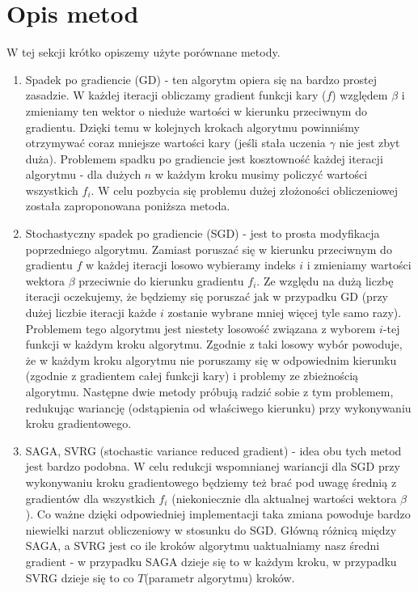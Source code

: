 \documentclass[a4paper]{article}
\begin{document}
\section{Opis metod}
W tej sekcji krótko opiszemy użyte porównane metody.
\begin{enumerate}
\item Spadek po gradiencie (GD) -  ten algorytm opiera się na bardzo prostej zasadzie. W każdej iteracji obliczamy gradient funkcji kary ($f$) względem $\beta$ i zmieniamy ten wektor o nieduże wartości w kierunku przeciwnym do gradientu. Dzięki temu w kolejnych krokach algorytmu powinniśmy otrzymywać coraz mniejsze wartości kary (jeśli stała uczenia $\gamma$ nie jest zbyt duża). Problemem spadku po gradiencie jest kosztowność każdej iteracji algorytmu - dla dużych $n$ w każdym kroku musimy policzyć wartości wszystkich $f_i$. W celu pozbycia się problemu dużej złożoności obliczeniowej została zaproponowana poniższa metoda.
\item Stochastyczny spadek po gradiencie (SGD) - jest to prosta modyfikacja poprzedniego algorytmu. Zamiast poruszać się w kierunku przeciwnym do gradientu $f$ w każdej iteracji losowo wybieramy indeks $i$ i zmieniamy wartości wektora $\beta$ przeciwnie do kierunku gradientu $f_i$. Ze względu na dużą liczbę iteracji oczekujemy, że będziemy się poruszać jak w przypadku GD (przy dużej liczbie iteracji każde $i$ zostanie wybrane mniej więcej tyle samo razy). Problemem tego algorytmu jest niestety losowość związana z wyborem $i$-tej funkcji w każdym kroku algorytmu. Zgodnie z \cite{SVRG} taki losowy wybór powoduje, że w każdym kroku algorytmu nie poruszamy się w odpowiednim kierunku (zgodnie z gradientem całej funkcji kary) i problemy ze zbieżnością algorytmu. Następne dwie metody próbują radzić sobie z tym problemem, redukując wariancję (odstąpienia od właściwego kierunku) przy wykonywaniu kroku gradientowego.  
\item SAGA, SVRG (stochastic variance reduced gradient) - idea obu tych metod jest bardzo podobna. W celu redukcji wspomnianej wariancji dla SGD przy wykonywaniu kroku gradientowego będziemy też brać pod uwagę średnią z gradientów dla wszystkich $f_i$ (niekoniecznie dla aktualnej wartości wektora $\beta$). Co ważne dzięki odpowiedniej implementacji taka zmiana powoduje bardzo niewielki narzut obliczeniowy w stosunku do SGD. Główną różnicą między SAGA, a SVRG jest co ile kroków algorytmu uaktualniamy nasz średni gradient - w przypadku SAGA dzieje się to w każdym kroku, w przypadku SVRG dzieje się to co $T$(parametr algorytmu) kroków.
\end{enumerate}
\end{document}
